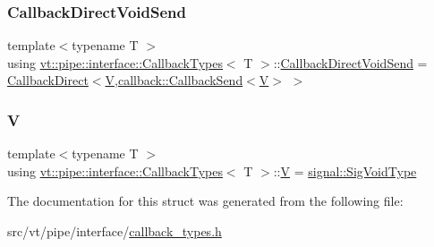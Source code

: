 \subsubsection{\texorpdfstring{Callback\+Direct\+Void\+Send}{CallbackDirectVoidSend}}
{\footnotesize\ttfamily template$<$typename T $>$ \\
using \hyperlink{structvt_1_1pipe_1_1interface_1_1_callback_types}{vt\+::pipe\+::interface\+::\+Callback\+Types}$<$ T $>$\+::\hyperlink{structvt_1_1pipe_1_1interface_1_1_callback_types_a84e507d3d6796d89e56a627f9d619f36}{Callback\+Direct\+Void\+Send} =  \hyperlink{structvt_1_1pipe_1_1interface_1_1_callback_direct}{Callback\+Direct}$<$\hyperlink{structvt_1_1pipe_1_1interface_1_1_callback_types_aa4679a7719d01aefcc378cac3d3fa7a2}{V},\hyperlink{structvt_1_1pipe_1_1callback_1_1_callback_send}{callback\+::\+Callback\+Send}$<$\hyperlink{structvt_1_1pipe_1_1interface_1_1_callback_types_aa4679a7719d01aefcc378cac3d3fa7a2}{V}$>$ $>$}

\mbox{\label{structvt_1_1pipe_1_1interface_1_1_callback_types_aa4679a7719d01aefcc378cac3d3fa7a2}} 
\subsubsection{\texorpdfstring{V}{V}}
{\footnotesize\ttfamily template$<$typename T $>$ \\
using \hyperlink{structvt_1_1pipe_1_1interface_1_1_callback_types}{vt\+::pipe\+::interface\+::\+Callback\+Types}$<$ T $>$\+::\hyperlink{structvt_1_1pipe_1_1interface_1_1_callback_types_aa4679a7719d01aefcc378cac3d3fa7a2}{V} =  \hyperlink{namespacevt_1_1pipe_1_1signal_acbe257d1ae44f20fa9fd9b6ed3057caf}{signal\+::\+Sig\+Void\+Type}}



The documentation for this struct was generated from the following file\+:\begin{DoxyCompactItemize}
\item 
src/vt/pipe/interface/\hyperlink{callback__types_8h}{callback\+\_\+types.\+h}\end{DoxyCompactItemize}
